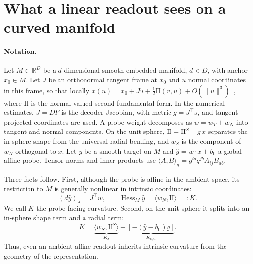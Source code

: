 \documentclass{article}
\begin{document}
\section{What a linear readout sees on a curved manifold}
\label{sec:theory}


\paragraph{Notation.}
Let $M\subset\mathbb{R}^D$ be a $d$-dimensional
smooth embedded manifold, $d<D$, with anchor
$x_0\in M$. Let $J$ be an orthonormal tangent
frame at $x_0$ and $u$ normal coordinates in
this frame, so that locally
$x(u)=x_0+Ju+\tfrac12\mathrm{II}(u,u)
+O(\|u\|^3)$~\citep{lee2018riemannian}, where $\mathrm{II}$ is the
normal-valued second fundamental form. In
the numerical estimates, $J=DF$ is the
decoder Jacobian, with metric $g=J^\top J$,
and tangent-projected coordinates are used.
A probe weight decomposes as $w=w_T+w_N$
into tangent and normal components. On the
unit sphere, $\mathrm{II}=\mathrm{II}^S-g\,x$
separates the in-sphere shape from the
universal radial bending, and $w_S$ is
the component of $w_N$ orthogonal to $x$.
Let $y$ be a smooth target on $M$ and
$\hat y=w\cdot x+b_0$ a global affine probe.
Tensor norms and inner products use
$\langle A,B\rangle_g
=g^{ia}g^{jb}A_{ij}B_{ab}$.

Three facts follow. First, although the
probe is affine in the ambient space, its
restriction to $M$ is generally nonlinear
in intrinsic coordinates:
\begin{equation}
(d\hat y)_J=J^\top w,\qquad
\operatorname{Hess}_M\hat y
=\langle w_N,\mathrm{II}\rangle=:K.
\label{eq:hess}
\end{equation}
We call $K$ the probe-facing curvature.
Second, on the unit sphere it splits into
an in-sphere shape term and a radial term:
\begin{equation}
K=
\underbrace{\langle w_S,\mathrm{II}^S
\rangle}_{K_S}
+
\underbrace{[-(\hat y-b_0)g]}_{K_{\mathrm{sph}}}.
\label{eq:split}
\end{equation}
Thus, even an ambient affine readout
inherits intrinsic curvature from the
geometry of the representation.
\end{document}
